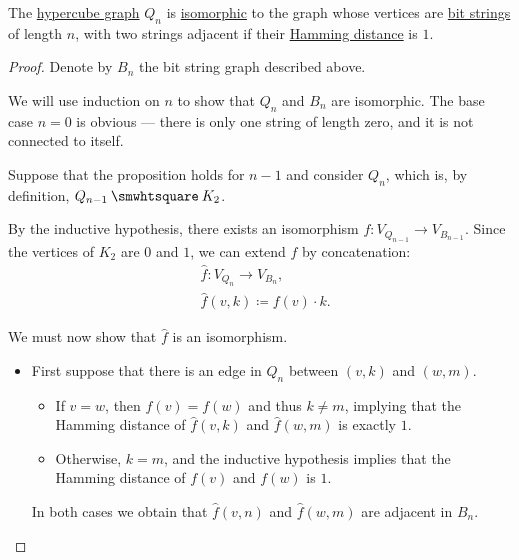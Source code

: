 \begin{proposition}\label{thm:hypercube_graphs_as_strings}
  The \hyperref[def:hypercube_graph]{hypercube graph} \( Q_n \) is \hyperref[def:undirected_graph/homomorphism]{isomorphic} to the graph whose vertices are \hyperref[def:bit_string]{bit strings} of length \( n \), with two strings adjacent if their \hyperref[def:hamming_distance]{Hamming distance} is \( 1 \).
\end{proposition}
\begin{proof}
  Denote by \( B_n \) the bit string graph described above.

  We will use induction on \( n \) to show that \( Q_n \) and \( B_n \) are isomorphic. The base case \( n = 0 \) is obvious --- there is only one string of length zero, and it is not connected to itself.

  Suppose that the proposition holds for \( n - 1 \) and consider \( Q_n \), which is, by definition, \( Q_{n-1} \boxprod K_2 \).

  By the inductive hypothesis, there exists an isomorphism \( f: V_{Q_{n-1}} \to V_{B_{n-1}} \). Since the vertices of \( K_2 \) are \( 0 \) and \( 1 \), we can extend \( f \) by concatenation:
  \begin{equation*}
    \begin{aligned}
      &\widehat f: V_{Q_n} \to V_{B_n}, \\
      &\widehat f(v, k) \coloneqq f(v) \cdot k.
    \end{aligned}
  \end{equation*}

  We must now show that \( \widehat f \) is an isomorphism.

  \begin{itemize}
    \item First suppose that there is an edge in \( Q_n \) between \( (v, k) \) and \( (w, m) \).
    \begin{itemize}
      \item If \( v = w \), then \( f(v) = f(w) \) and thus \( k \neq m \), implying that the Hamming distance of \( \widehat f(v, k) \) and \( \widehat f(w, m) \) is exactly \( 1 \).

      \item Otherwise, \( k = m \), and the inductive hypothesis implies that the Hamming distance of \( f(v) \) and \( f(w) \) is \( 1 \).
    \end{itemize}

    In both cases we obtain that \( \widehat f(v, n) \) and \( \widehat f(w, m) \) are adjacent in \( B_n \).


\end{itemize}
\end{proof}
